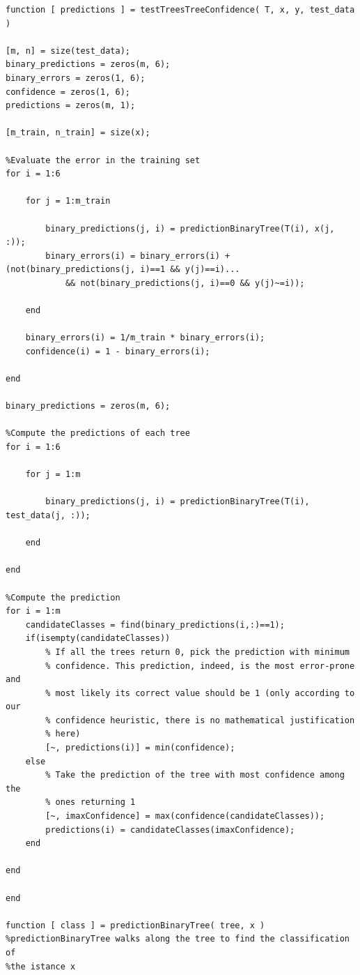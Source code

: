 \documentclass{article}
\begin{document}
\begin{lstlisting}[firstnumber=28]
function [ predictions ] = testTreesTreeConfidence( T, x, y, test_data )

[m, n] = size(test_data);
binary_predictions = zeros(m, 6);
binary_errors = zeros(1, 6);
confidence = zeros(1, 6);
predictions = zeros(m, 1);

[m_train, n_train] = size(x);

%Evaluate the error in the training set
for i = 1:6

    for j = 1:m_train
        
        binary_predictions(j, i) = predictionBinaryTree(T(i), x(j, :));
        binary_errors(i) = binary_errors(i) + (not(binary_predictions(j, i)==1 && y(j)==i)...
            && not(binary_predictions(j, i)==0 && y(j)~=i));
   
    end
    
    binary_errors(i) = 1/m_train * binary_errors(i);
    confidence(i) = 1 - binary_errors(i);

end

binary_predictions = zeros(m, 6);

%Compute the predictions of each tree
for i = 1:6

    for j = 1:m
        
        binary_predictions(j, i) = predictionBinaryTree(T(i), test_data(j, :));
   
    end

end

%Compute the prediction
for i = 1:m
    candidateClasses = find(binary_predictions(i,:)==1);
    if(isempty(candidateClasses))
        % If all the trees return 0, pick the prediction with minimum
        % confidence. This prediction, indeed, is the most error-prone and
        % most likely its correct value should be 1 (only according to our
        % confidence heuristic, there is no mathematical justification
        % here)
        [~, predictions(i)] = min(confidence);
    else
        % Take the prediction of the tree with most confidence among the
        % ones returning 1
        [~, imaxConfidence] = max(confidence(candidateClasses));
        predictions(i) = candidateClasses(imaxConfidence);
    end

end

end

function [ class ] = predictionBinaryTree( tree, x )
%predictionBinaryTree walks along the tree to find the classification of
%the istance x
    

\end{lstlisting}
\end{document}
